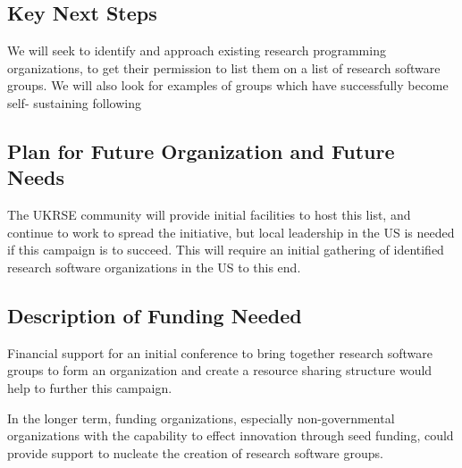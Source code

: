 \subsection{Key Next Steps}

We will seek to identify and approach existing research programming organizations,
to get their permission to list them on a list of research software groups.
We will also look for examples of groups which have successfully become self-
sustaining following

\subsection{Plan for Future Organization and Future Needs}

The UKRSE community will provide initial facilities to host this list, and
continue to work to spread the initiative, but local leadership in the US
is needed if this campaign is to succeed. This will require an initial gathering
of identified research software organizations in the US to this end.

\subsection{Description of Funding Needed}

Financial support for an initial conference to bring together research software
groups to form an organization and create a resource sharing structure would
help to further this campaign.

In the longer term, funding organizations, especially non-governmental organizations
with the capability to effect innovation through seed funding, could provide
support to nucleate the creation of research software groups.
